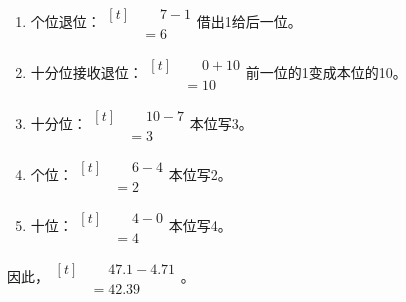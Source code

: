{\begin{enumerate}[leftmargin=1.7em,itemsep=5pt,topsep=0pt]
\item 个位退位：\(\begin{aligned}[t]&\phantom{={}}7-1\\&=6\end{aligned}\)\quad 借出1给后一位。
\item 十分位接收退位：\(\begin{aligned}[t]&\phantom{={}}0+10\\&=10\end{aligned}\)\quad 前一位的1变成本位的10。
\item 十分位：\(\begin{aligned}[t]&\phantom{={}}10-7\\&=3\end{aligned}\)\quad 本位写3。
\item 个位：\(\begin{aligned}[t]&\phantom{={}}6-4\\&=2\end{aligned}\)\quad 本位写2。
\item 十位：\(\begin{aligned}[t]&\phantom{={}}4-0\\&=4\end{aligned}\)\quad 本位写4。
\end{enumerate}
\par\smallskip
因此，\(\begin{aligned}[t]&\phantom{={}}47.1-4.71\\&=42.39\end{aligned}\)。
\par\medskip

}
